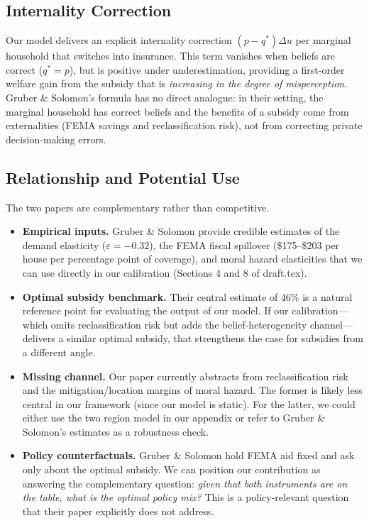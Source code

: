 \documentclass[12pt]{article}
\begin{document}
\subsection{Internality Correction}

Our model delivers an explicit internality correction $(p - q^*)\Delta u$ per marginal household that switches into insurance. This term vanishes when beliefs are correct ($q^* = p$), but is positive under underestimation, providing a first-order welfare gain from the subsidy that is \emph{increasing in the degree of misperception}. Gruber \& Solomon's formula has no direct analogue: in their setting, the marginal household has correct beliefs and the benefits of a subsidy come from externalities (FEMA savings and reclassification risk), not from correcting private decision-making errors.

\subsection{Relationship and Potential Use}

The two papers are complementary rather than competitive.

\begin{itemize}
    \item \textbf{Empirical inputs.} Gruber \& Solomon provide credible estimates of the demand elasticity ($\varepsilon = -0.32$), the FEMA fiscal spillover (\$175--\$203 per house per percentage point of coverage), and moral hazard elasticities that we can use directly in our calibration (Sections 4 and 8 of draft.tex).

    \item \textbf{Optimal subsidy benchmark.} Their central estimate of 46\% is a natural reference point for evaluating the output of our model. If our calibration---which omits reclassification risk but adds the belief-heterogeneity channel---delivers a similar optimal subsidy, that strengthens the case for subsidies from a different angle.

    \item \textbf{Missing channel.} Our paper currently abstracts from reclassification risk and the mitigation/location margins of moral hazard. The former is likely less central in our framework (since our model is static). For the latter, we could either use the two region model in our appendix or refer to Gruber \& Solomon's estimates as a robustness check.

    \item \textbf{Policy counterfactuals.} Gruber \& Solomon hold FEMA aid fixed and ask only about the optimal subsidy. We can position our contribution as answering the complementary question: \emph{given that both instruments are on the table, what is the optimal policy mix?} This is a policy-relevant question that their paper explicitly does not address.
\end{itemize}
\end{document}
